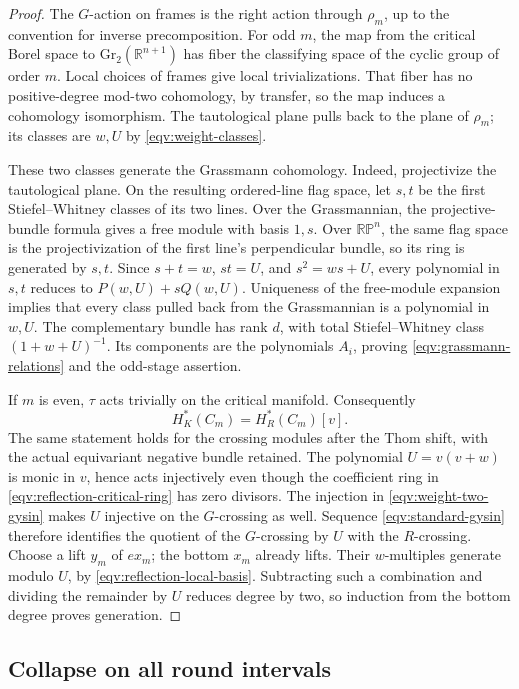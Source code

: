 \begin{proof}
The \(G\)-action on frames is the right action through \(\rho_m\),
up to the convention for inverse precomposition.
For odd \(m\), the map from the critical Borel space to
\(\mathrm{Gr}_2(\mathbb R^{n+1})\) has fiber the classifying space
of the cyclic group of order \(m\).
Local choices of frames give local trivializations.
That fiber has no positive-degree mod-two cohomology, by transfer,
so the map induces a cohomology isomorphism.
The tautological plane pulls back to the plane of \(\rho_m\);
its classes are \(w,U\) by \eqref{eqv:weight-classes}.

These two classes generate the Grassmann cohomology.
Indeed, projectivize the tautological plane.
On the resulting ordered-line flag space, let \(s,t\) be the first
Stiefel--Whitney classes of its two lines.
Over the Grassmannian, the projective-bundle formula gives a free
module with basis \(1,s\).
Over \(\mathbb{RP}^n\), the same flag space is the projectivization
of the first line's perpendicular bundle, so its ring is generated
by \(s,t\).
Since \(s+t=w\), \(st=U\), and \(s^2=ws+U\), every polynomial
in \(s,t\) reduces to \(P(w,U)+sQ(w,U)\).
Uniqueness of the free-module expansion implies that every class
pulled back from the Grassmannian is a polynomial in \(w,U\).
The complementary bundle has rank \(d\), with total
Stiefel--Whitney class \((1+w+U)^{-1}\).
Its components are the polynomials \(A_i\), proving
\eqref{eqv:grassmann-relations} and the odd-stage assertion.

If \(m\) is even, \(\tau\) acts trivially on the critical manifold.
Consequently
\[
 H_K^*(C_m)=H_R^*(C_m)[v].
\]
The same statement holds for the crossing modules after the Thom
shift, with the actual equivariant negative bundle retained.
The polynomial \(U=v(v+w)\) is monic in \(v\), hence acts injectively
even though the coefficient ring in
\eqref{eqv:reflection-critical-ring} has zero divisors.
The injection in \eqref{eqv:weight-two-gysin} makes \(U\) injective
on the \(G\)-crossing as well.
Sequence \eqref{eqv:standard-gysin} therefore identifies the quotient
of the \(G\)-crossing by \(U\) with the \(R\)-crossing.
Choose a lift \(y_m\) of \(ex_m\); the bottom \(x_m\) already lifts.
Their \(w\)-multiples generate modulo \(U\), by
\eqref{eqv:reflection-local-basis}.
Subtracting such a combination and dividing the remainder by \(U\)
reduces degree by two, so induction from the bottom degree proves
generation.
\end{proof}

\subsection{Collapse on all round intervals}

